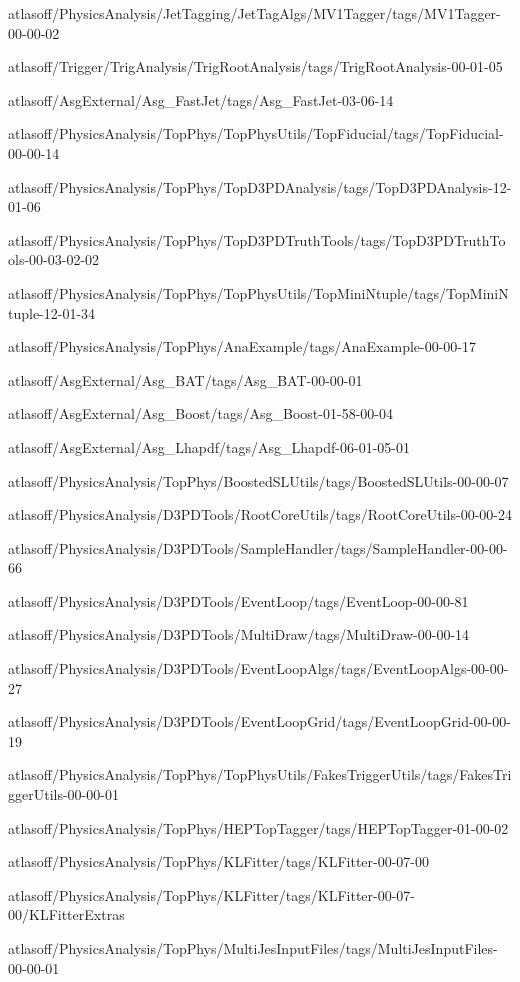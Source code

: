 atlasoff/PhysicsAnalysis/JetTagging/JetTagAlgs/MV1Tagger/tags/MV1Tagger-00-00-02

atlasoff/Trigger/TrigAnalysis/TrigRootAnalysis/tags/TrigRootAnalysis-00-01-05

atlasoff/AsgExternal/Asg\_FastJet/tags/Asg\_FastJet-03-06-14

atlasoff/PhysicsAnalysis/TopPhys/TopPhysUtils/TopFiducial/tags/TopFiducial-00-00-14

atlasoff/PhysicsAnalysis/TopPhys/TopD3PDAnalysis/tags/TopD3PDAnalysis-12-01-06

atlasoff/PhysicsAnalysis/TopPhys/TopD3PDTruthTools/tags/TopD3PDTruthTools-00-03-02-02

atlasoff/PhysicsAnalysis/TopPhys/TopPhysUtils/TopMiniNtuple/tags/TopMiniNtuple-12-01-34

atlasoff/PhysicsAnalysis/TopPhys/AnaExample/tags/AnaExample-00-00-17

atlasoff/AsgExternal/Asg\_BAT/tags/Asg\_BAT-00-00-01

atlasoff/AsgExternal/Asg\_Boost/tags/Asg\_Boost-01-58-00-04

atlasoff/AsgExternal/Asg\_Lhapdf/tags/Asg\_Lhapdf-06-01-05-01

atlasoff/PhysicsAnalysis/TopPhys/BoostedSLUtils/tags/BoostedSLUtils-00-00-07

atlasoff/PhysicsAnalysis/D3PDTools/RootCoreUtils/tags/RootCoreUtils-00-00-24

atlasoff/PhysicsAnalysis/D3PDTools/SampleHandler/tags/SampleHandler-00-00-66

atlasoff/PhysicsAnalysis/D3PDTools/EventLoop/tags/EventLoop-00-00-81

atlasoff/PhysicsAnalysis/D3PDTools/MultiDraw/tags/MultiDraw-00-00-14

atlasoff/PhysicsAnalysis/D3PDTools/EventLoopAlgs/tags/EventLoopAlgs-00-00-27

atlasoff/PhysicsAnalysis/D3PDTools/EventLoopGrid/tags/EventLoopGrid-00-00-19

atlasoff/PhysicsAnalysis/TopPhys/TopPhysUtils/FakesTriggerUtils/tags/FakesTriggerUtils-00-00-01

atlasoff/PhysicsAnalysis/TopPhys/HEPTopTagger/tags/HEPTopTagger-01-00-02

atlasoff/PhysicsAnalysis/TopPhys/KLFitter/tags/KLFitter-00-07-00

atlasoff/PhysicsAnalysis/TopPhys/KLFitter/tags/KLFitter-00-07-00/KLFitterExtras

atlasoff/PhysicsAnalysis/TopPhys/MultiJesInputFiles/tags/MultiJesInputFiles-00-00-01

